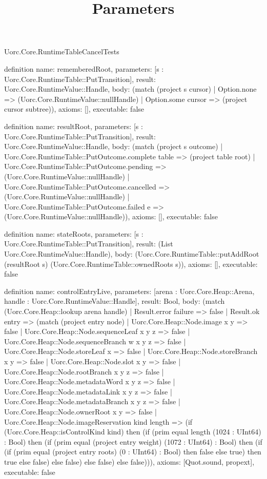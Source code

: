 \begin{lexlean}{Uorc.Core.RuntimeTableCancelTests}
\title{Parameters}
\begin{semanticmodule}
definition{
  name: rememberedRoot,
  parameters: [s : Uorc.Core.RuntimeTable::PutTransition],
  result: Uorc.Core.RuntimeValue::Handle,
  body: (match (project s cursor)
    | Option.none => (Uorc.Core.RuntimeValue::nullHandle)
    | Option.some cursor => (project cursor subtree)),
  axioms: [],
  executable: false
}

definition{
  name: resultRoot,
  parameters: [s : Uorc.Core.RuntimeTable::PutTransition],
  result: Uorc.Core.RuntimeValue::Handle,
  body: (match (project s outcome)
    | Uorc.Core.RuntimeTable::PutOutcome.complete table => (project table root)
    | Uorc.Core.RuntimeTable::PutOutcome.pending => (Uorc.Core.RuntimeValue::nullHandle)
    | Uorc.Core.RuntimeTable::PutOutcome.cancelled => (Uorc.Core.RuntimeValue::nullHandle)
    | Uorc.Core.RuntimeTable::PutOutcome.failed e => (Uorc.Core.RuntimeValue::nullHandle)),
  axioms: [],
  executable: false
}

definition{
  name: stateRoots,
  parameters: [s : Uorc.Core.RuntimeTable::PutTransition],
  result: (List Uorc.Core.RuntimeValue::Handle),
  body: (Uorc.Core.RuntimeTable::putAddRoot (resultRoot s) (Uorc.Core.RuntimeTable::ownedRoots s)),
  axioms: [],
  executable: false
}

definition{
  name: controlEntryLive,
  parameters: [arena : Uorc.Core.Heap::Arena, handle : Uorc.Core.RuntimeValue::Handle],
  result: Bool,
  body: (match (Uorc.Core.Heap::lookup arena handle)
    | Result.error failure => false
    | Result.ok entry => (match (project entry node)
      | Uorc.Core.Heap::Node.image x y => false
      | Uorc.Core.Heap::Node.sequenceLeaf x y z => false
      | Uorc.Core.Heap::Node.sequenceBranch w x y z => false
      | Uorc.Core.Heap::Node.storeLeaf x => false
      | Uorc.Core.Heap::Node.storeBranch x y => false
      | Uorc.Core.Heap::Node.slot x y => false
      | Uorc.Core.Heap::Node.rootBranch x y z => false
      | Uorc.Core.Heap::Node.metadataWord x y z => false
      | Uorc.Core.Heap::Node.metadataLink x y z => false
      | Uorc.Core.Heap::Node.metadataBranch x y z => false
      | Uorc.Core.Heap::Node.ownerRoot x y => false
      | Uorc.Core.Heap::Node.imageReservation kind length => (if (Uorc.Core.Heap::isControlKind kind) then (if (prim equal length (1024 : UInt64) : Bool) then (if (prim equal (project entry weight) (1072 : UInt64) : Bool) then (if (if (prim equal (project entry roots) (0 : UInt64) : Bool) then false else true) then true else false) else false) else false) else false))),
  axioms: [Quot.sound, propext],
  executable: false
}


\end{semanticmodule}
\end{lexlean}
